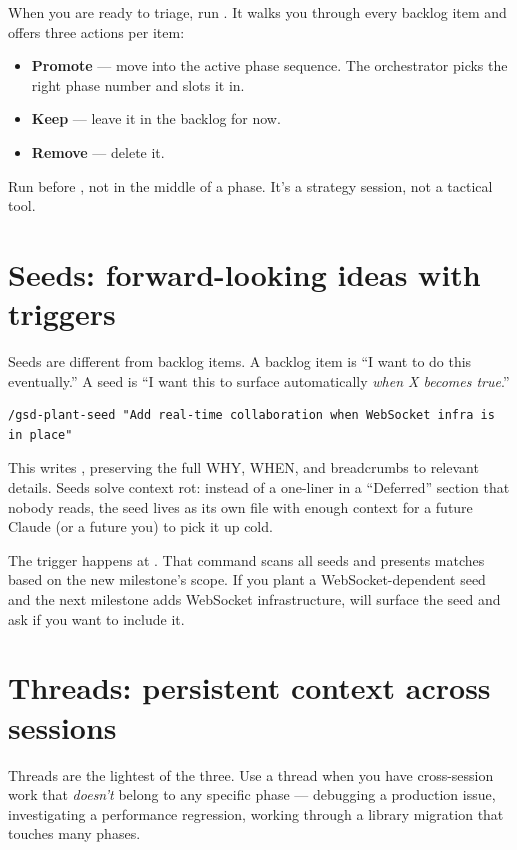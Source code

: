 \documentclass[11pt,letterpaper,openany]{book}
\begin{document}
When you are ready to triage, run . It walks you through every backlog item and offers three actions per item:

\begin{itemize}[itemsep=2pt]
  \item \textbf{Promote} --- move into the active phase sequence. The orchestrator picks the right phase number and slots it in.
  \item \textbf{Keep} --- leave it in the backlog for now.
  \item \textbf{Remove} --- delete it.
\end{itemize}

Run  before , not in the middle of a phase. It's a strategy session, not a tactical tool.

\section{Seeds: forward-looking ideas with triggers}

Seeds are different from backlog items. A backlog item is ``I want to do this eventually.'' A seed is ``I want this to surface automatically \emph{when X becomes true}.''

\begin{lstlisting}
/gsd-plant-seed "Add real-time collaboration when WebSocket infra is in place"
\end{lstlisting}

This writes , preserving the full WHY, WHEN, and breadcrumbs to relevant details. Seeds solve context rot: instead of a one-liner in a ``Deferred'' section that nobody reads, the seed lives as its own file with enough context for a future Claude (or a future you) to pick it up cold.

The trigger happens at . That command scans all seeds and presents matches based on the new milestone's scope. If you plant a WebSocket-dependent seed and the next milestone adds WebSocket infrastructure,  will surface the seed and ask if you want to include it.

\section{Threads: persistent context across sessions}

Threads are the lightest of the three. Use a thread when you have cross-session work that \emph{doesn't} belong to any specific phase --- debugging a production issue, investigating a performance regression, working through a library migration that touches many phases.
\end{document}
